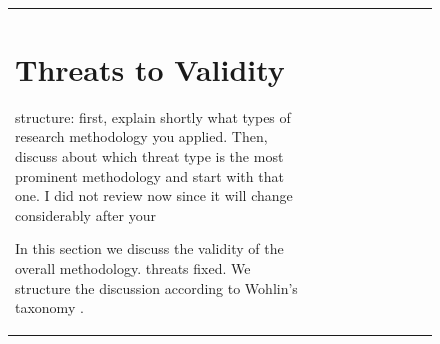 \documentclass[12pt,journal,compsoc]{../sty/IEEEtran}
\begin{document}
\begin{table}[!t]
\begin{figure}[!t]
\begin{compactitem}
\begin{table}[!t]
\begin{tabular}{|l||c||c||c||c||c||c||c||c||c|}
\section{Threats to Validity} \label{valt} %
structure: first, explain shortly what types of  %
research methodology you applied. Then, discuss  %
about which threat type is the most prominent  %
methodology and start with that one. I did not review  %
now since it will change considerably after your  %

In this section we discuss the validity of the overall methodology. %
threats  %
fixed. We structure the discussion according to Wohlin's taxonomy
\cite{Wohlin2000}.




\end{tabular}
\end{table}
\end{compactitem}
\end{figure}
\end{table}
\end{document}
